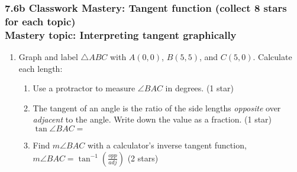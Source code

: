 \documentclass[12pt, twoside]{article}
\begin{document}
\subsubsection*{7.6b Classwork Mastery: Tangent function (collect 8 stars for each topic)\\[0.5cm]
Mastery topic: Interpreting tangent graphically}

\begin{enumerate}

\item Graph and label $\triangle ABC$ with $A(0,0)$, $B(5,5)$, and $C(5,0)$. Calculate each length:
  \begin{enumerate}[itemsep=1.25cm]
    \vspace{2cm}
    \item Use a protractor to measure $\angle BAC$ in degrees.  \hfill (1 star)
    \item The tangent of an angle is the ratio of the side lengths \emph{opposite} over \emph{adjacent} to the angle. Write down the value as a fraction.  \hfill (1 star)\\[0.5cm]
      $\tan \angle BAC=$
    \item Find $m\angle BAC$ with a calculator's inverse tangent function,\\ $\displaystyle m \angle BAC = \tan^{-1}(\frac{opp}{adj})$  \hfill (2 stars)
  \end{enumerate}

\newpage

\end{enumerate}
\end{document}
